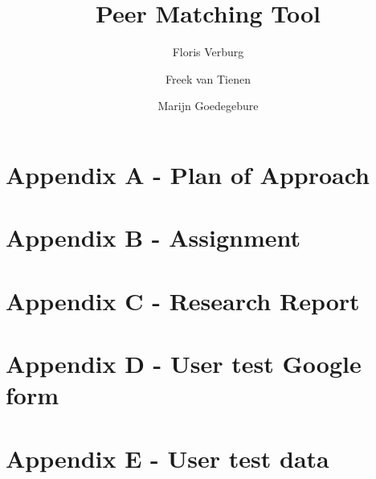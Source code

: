 \documentclass{tudelft-report}
\begin{document}
\frontmatter

\title[TI3800 Bachelorproject]{Peer Matching Tool}
\author{Floris Verburg \and Freek van Tienen \and Marijn Goedegebure}
\makecover







\tableofcontents

\mainmatter













\appendix

%
\chapter{Appendix A - Plan of Approach}


\chapter{Appendix B - Assignment}
\label{app:assignment}


\chapter{Appendix C - Research Report}


\chapter{Appendix D - User test Google form}
\label{app:survey}


\chapter{Appendix E - User test data}


%
%



\end{document}
